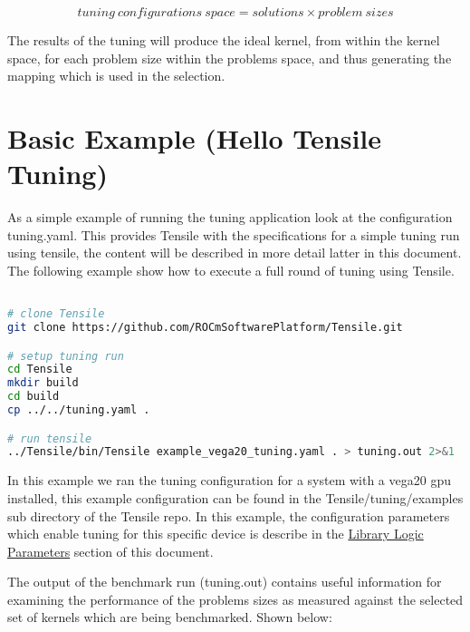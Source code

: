 \documentclass[]{article}
\begin{document}
\begin{figure}[h]
	
	\[ tuning\ configurations\ space = solutions \times problem\ sizes \]
	
\end{figure}

The results of the tuning will produce the ideal kernel, from within the kernel space, for each problem size within the problems space, and thus generating the mapping which is used in the selection.

\section{Basic Example (Hello Tensile Tuning)}

As a simple example of running the tuning application look at the configuration tuning.yaml. This provides Tensile with the specifications for a simple tuning run using tensile, the content will be described in more detail latter in this document. The following example show how to execute a full round of tuning using Tensile.

\begin{lstlisting}[language=bash,breaklines=true]

# clone Tensile
git clone https://github.com/ROCmSoftwarePlatform/Tensile.git

# setup tuning run
cd Tensile
mkdir build
cd build
cp ../../tuning.yaml .

# run tensile
../Tensile/bin/Tensile example_vega20_tuning.yaml . > tuning.out 2>&1 
\end{lstlisting}

In this example we ran the tuning configuration for a system with a vega20 gpu installed, this example configuration can be found in the Tensile/tuning/examples sub directory of the Tensile repo. In this example, the configuration parameters which enable tuning for this specific device is describe in the  \hyperref[sec:LibraryLogic]{Library  Logic Parameters} section of this document.

The output of the benchmark run (tuning.out) contains useful information for examining the performance of the problems sizes as measured against the selected set of kernels which are being benchmarked. Shown below:  
\end{document}
